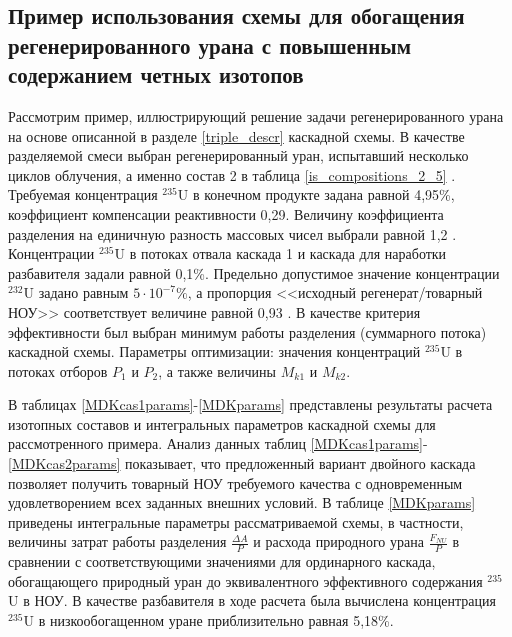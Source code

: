 \subsection{Пример использования схемы для обогащения регенерированного урана с повышенным содержанием четных изотопов}\label{example_trip}

Рассмотрим пример, иллюстрирующий решение задачи регенерированного урана на основе описанной в разделе \ref{triple_descr} каскадной схемы. В качестве разделяемой смеси выбран регенерированный уран, испытавший несколько циклов облучения, а именно состав 2 в таблица \ref{is_compositions_2_5} \cite{smirnovObogashchenieRegenerirovannogoUrana2018}. Требуемая концентрация $^{235}$U в конечном продукте задана равной 4,95\%, коэффициент компенсации реактивности 0,29. Величину коэффициента разделения на единичную разность массовых чисел выбрали равной 1,2 \cite{smirnovKaskadnyeShemyZadachah2012}. Концентрации $^{235}$U в потоках отвала каскада 1 и каскада для наработки разбавителя задали равной 0,1\%. Предельно допустимое значение концентрации $^{232}$U задано равным $5\cdot10^{-7} \%$, а пропорция <<исходный регенерат/товарный НОУ>> соответствует величине равной 0,93 \cite{smirnovObogashchenieRegenerirovannogoUrana2018}. В качестве критерия эффективности был выбран минимум работы разделения (суммарного потока) каскадной схемы. Параметры оптимизации: значения концентраций $^{235}$U в потоках отборов $P_1$ и $P_2$, а также величины $M_{k1}$ и $M_{k2}$. 

В таблицах \ref{MDKcas1params}-\ref{MDKparams} представлены результаты расчета изотопных составов и интегральных параметров каскадной схемы для рассмотренного примера. Анализ данных таблиц \ref{MDKcas1params}-\ref{MDKcas2params} показывает, что предложенный вариант двойного каскада позволяет получить товарный НОУ требуемого качества с одновременным удовлетворением всех заданных внешних условий. В таблице \ref{MDKparams} приведены интегральные параметры рассматриваемой схемы, в частности, величины затрат работы разделения $\frac{\Delta A}{P}$ и расхода природного урана $\frac{F_{NU}}{P}$ в сравнении с соответствующими значениями для ординарного каскада, обогащающего природный уран до эквивалентного эффективного содержания $^{235}$U в НОУ.
В качестве разбавителя в ходе расчета была вычислена концентрация $^{235}$U  в низкообогащенном уране приблизительно равная 5,18\%.    


